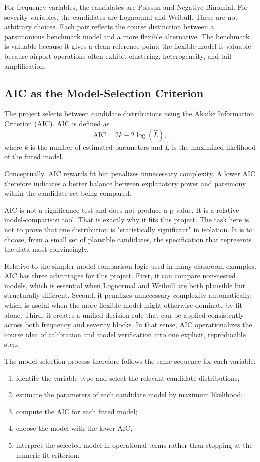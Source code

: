 \documentclass[11pt]{article}
\begin{document}
For frequency variables, the candidates are Poisson and Negative Binomial. For severity variables, the candidates are Lognormal and Weibull. These are not arbitrary choices. Each pair reflects the course distinction between a parsimonious benchmark model and a more flexible alternative. The benchmark is valuable because it gives a clean reference point; the flexible model is valuable because airport operations often exhibit clustering, heterogeneity, and tail amplification.

\subsection{AIC as the Model-Selection Criterion}
The project selects between candidate distributions using the Akaike Information Criterion (AIC). AIC is defined as
\[
\mathrm{AIC}=2k-2\log(\hat{L}),
\]
where \(k\) is the number of estimated parameters and \(\hat{L}\) is the maximized likelihood of the fitted model.

Conceptually, AIC rewards fit but penalizes unnecessary complexity. A lower AIC therefore indicates a better balance between explanatory power and parsimony within the candidate set being compared.

AIC is not a significance test and does not produce a p-value. It is a relative model-comparison tool. That is exactly why it fits this project. The task here is not to prove that one distribution is "statistically significant" in isolation. It is to choose, from a small set of plausible candidates, the specification that represents the data most convincingly.

Relative to the simpler model-comparison logic used in many classroom examples, AIC has three advantages for this project. First, it can compare non-nested models, which is essential when Lognormal and Weibull are both plausible but structurally different. Second, it penalizes unnecessary complexity automatically, which is useful when the more flexible model might otherwise dominate by fit alone. Third, it creates a unified decision rule that can be applied consistently across both frequency and severity blocks. In that sense, AIC operationalizes the course idea of calibration and model verification into one explicit, reproducible step.

The model-selection process therefore follows the same sequence for each variable:
\begin{enumerate}
  \item identify the variable type and select the relevant candidate distributions;
  \item estimate the parameters of each candidate model by maximum likelihood;
  \item compute the AIC for each fitted model;
  \item choose the model with the lower AIC;
  \item interpret the selected model in operational terms rather than stopping at the numeric fit criterion.
\end{enumerate}
\end{document}
